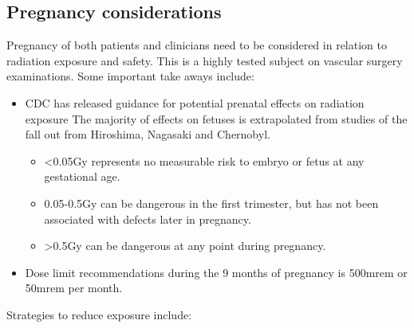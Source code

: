\documentclass[
]{book}
\begin{document}
\hypertarget{pregnancy-considerations}{%
\subsection{Pregnancy considerations}\label{pregnancy-considerations}}

Pregnancy of both patients and clinicians need to be considered in
relation to radiation exposure and safety.\citep{chandra2013, mitchell2011, shaw2011} This is a highly tested subject on vascular surgery
examinations. Some important take aways include:

\begin{itemize}
\item
  CDC has released guidance for potential prenatal effects on
  radiation exposure\citep{cdc2011} The majority of effects on fetuses is
  extrapolated from studies of the fall out from Hiroshima, Nagasaki
  and Chernobyl.

  \begin{itemize}
  \item
    \textless0.05Gy represents no measurable risk to embryo or fetus at any
    gestational age.
  \item
    0.05-0.5Gy can be dangerous in the first trimester, but has not
    been associated with defects later in pregnancy.\citep{shaw2011}
  \item
    \textgreater0.5Gy can be dangerous at any point during pregnancy.
  \end{itemize}
\item
  Dose limit recommendations during the 9 months of pregnancy is
  500mrem or 50mrem per month.\citep{dauer2015, chandra2013}
\end{itemize}

Strategies to reduce exposure include:
\end{document}
